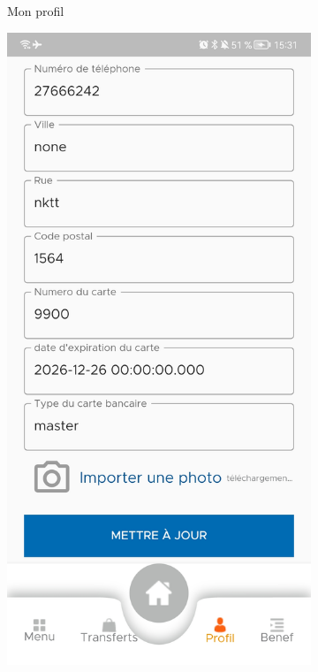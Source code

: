 \begin{figure}
\begin{subfigure}[b]{0.3\textwidth}
			\caption{Mon profil}
			\label{fig:y equals x}
		\end{subfigure}
		\hfill
		\begin{subfigure}[b]{0.3\textwidth}
			\centering
			\includegraphics[width=\textwidth]{./Template LaTeX/Images/7.jpg}

\end{subfigure}
\end{figure}

